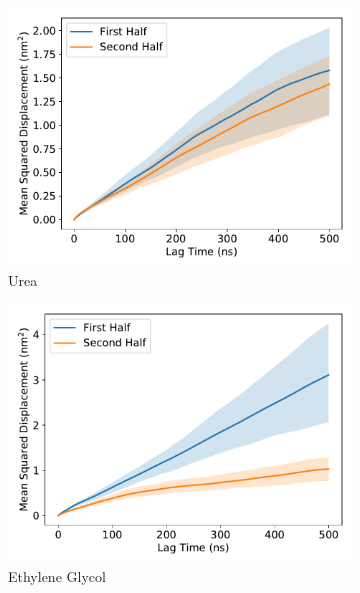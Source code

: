 \documentclass{article}
\begin{document}
  \begin{figure}
  \centering
  \begin{subfigure}{0.45\textwidth}
  \includegraphics[width=\textwidth]{URE_MSD_halves.pdf}
  \caption{Urea}\label{fig:URE_MSD_halves}
  \end{subfigure}
  \begin{subfigure}{0.45\textwidth}
  \includegraphics[width=\textwidth]{GCL_MSD_halves.pdf}
  \caption{Ethylene Glycol}\label{fig:GCL_MSD_halves}
  \end{subfigure}
  \begin{subfigure}{0.45\textwidth}

\end{subfigure}
\end{figure}
\end{document}
